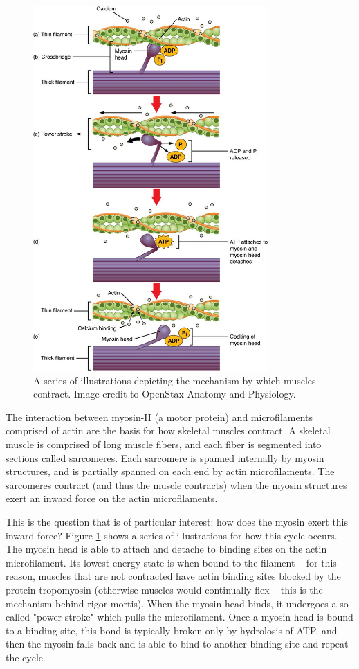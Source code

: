 \documentclass[11pt]{ucthesis}
\begin{document}
\begin{figure}
\centering
\includegraphics[width=0.8\textwidth]{actinmyosin}
\caption{A series of illustrations depicting the mechanism by which muscles contract. Image credit to OpenStax Anatomy and Physiology.\label{fig:actinmyosin}}
\end{figure}

The interaction between myosin-II (a motor protein) and microfilaments comprised of actin are the basis for how skeletal muscles contract. A skeletal muscle is comprised of long muscle fibers, and each fiber is segmented into sections called sarcomeres. Each sarcomere is spanned internally by myosin structures, and is partially spanned on each end by actin microfilaments. The sarcomeres contract (and thus the muscle contracts) when the myosin structures exert an inward force on the actin microfilaments.

This is the question that is of particular interest: how does the myosin exert this inward force? Figure \ref{fig:actinmyosin} shows a series of illustrations for how this cycle occurs. The myosin head is able to attach and detache to binding sites on the actin microfilament. Its lowest energy state is when bound to the filament -- for this reason, muscles that are not contracted have actin binding sites blocked by the protein tropomyosin (otherwise muscles would continually flex -- this is the mechanism behind rigor mortis). When the myosin head binds, it undergoes a so-called "power stroke" which pulls the microfilament. Once a myosin head is bound to a binding site, this bond is typically broken only by hydrolosis of ATP, and then the myosin falls back and is able to bind to another binding site and repeat the cycle.
\end{document}
